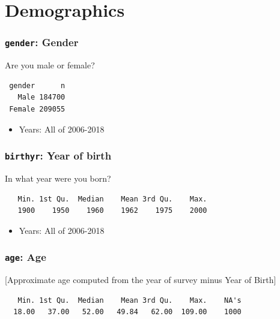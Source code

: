 \documentclass[10pt,article,oneside]{memoir}
\theoremstyle{definition}
\begin{document}
\hypertarget{demographics}{%
\section{Demographics}\label{demographics}}

\hypertarget{gender-gender}{%
\subsubsection{\texorpdfstring{\texttt{gender}:
Gender}{gender: Gender}}\label{gender-gender}}

Are you male or female?

\begin{verbatim}
 gender      n
   Male 184700
 Female 209055
\end{verbatim}

\begin{itemize}
\tightlist
\item
  Years: All of 2006-2018
\end{itemize}

\hypertarget{birthyr-year-of-birth}{%
\subsubsection{\texorpdfstring{\texttt{birthyr}: Year of
birth}{birthyr: Year of birth}}\label{birthyr-year-of-birth}}

In what year were you born?

\begin{verbatim}
   Min. 1st Qu.  Median    Mean 3rd Qu.    Max. 
   1900    1950    1960    1962    1975    2000 
\end{verbatim}

\begin{itemize}
\tightlist
\item
  Years: All of 2006-2018
\end{itemize}

\hypertarget{age-age}{%
\subsubsection{\texorpdfstring{\texttt{age}:
Age}{age: Age}}\label{age-age}}

{[}Approximate age computed from the year of survey minus Year of
Birth{]}

\begin{verbatim}
   Min. 1st Qu.  Median    Mean 3rd Qu.    Max.    NA's 
  18.00   37.00   52.00   49.84   62.00  109.00    1000 
\end{verbatim}
\end{document}
